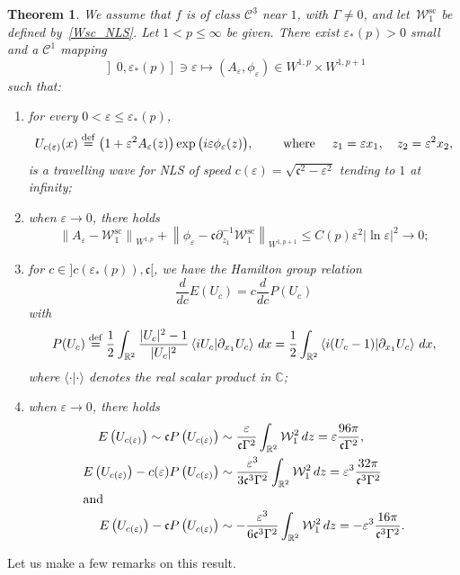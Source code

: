 \documentclass[10pt]{amsart}
\newtheorem{theo}{Theorem}[section]
\theoremstyle{definition}\newtheorem{defi}[theo]{Definition}\newtheorem{rema}[theo]{Remark}\newtheorem{exam}[theo]{Example}\newtheorem{exem}[theo]{Example}\newtheorem{nota}[theo]{Notation}
\newcommand*\p{\partial}
\newcommand*\R{\mathbb R}
\newcommand*\C{\mathbb C}
\newcommand*\ddef{\stackrel{\rm def}{=}}
\renewcommand{\sc}{\mathrm{sc}}
\newcommand*\BC{\mathcal{C}}
\newcommand*\BW{\mathcal{W}}
\newcommand*\cs{{\mathfrak c}}
\newcommand*\ii{\infty}
\newcommand*\ls{\leqslant }
\newcommand*\e{\varepsilon}
\newcommand*\lne{\lvert \ln \varepsilon \rvert}
\newcommand*{\romanenumi}{\renewcommand*{\theenumi}{\roman{enumi}}}
\begin{document}
\begin{theo}\label{mainTH}
We assume that $f$ is of class $ \BC^3 $ near $1 $, with $ \Gamma \neq 0 $, and let~$ \BW_1^{\sc} $ be defined by~\eqref{Wsc_NLS}. Let $ 1 < p \ls \ii $ be given. There exist $ \e_* (p) > 0 $ small and a $ \BC^1 $ mapping
\[
\left] 0, \e_*(p)\right] \ni \e \mapsto (A_\e, \phi_\e) \in W^{1,p} \times W^{1,p+1}
\]
such that:
\begin{enumerate}\romanenumi
\item\label{theo1.3.1} for every $ 0 < \e \ls \e_*(p) $,
\[
U_{c(\e)} (x) \ddef \big(1 + \e^2 A_\e (z) \big) \exp \big(i \e \phi_\e (z) \big),
\qquad \text{ where } \quad z_1 = \e x_1, \quad z_2 = \e^2 x_2,
\]
is a travelling wave for NLS of speed $ c(\e) = \sqrt{ \cs^2 - \e^2 } $ tending to $1$ at infinity;

\item\label{theo1.3.2} when $ \e \to 0 $, there holds
\[
\left\| A_\e - \BW_1^{\sc} \right\|_{ W^{1,p} } + \left\| \phi_\e - \cs \p_{z_1}^{-1} \BW_1^{\sc} \right\|_{ W^{1,p+1} }
\ls C(p) \e^2 \lne^2 \to 0 ;
\]
\item\label{theo1.3.3} for $ c \in] c(\e_*(p)), \cs [$, we have the Hamilton group relation
\[
\frac{d}{dc} E(U_c) = c \frac{d}{dc} P(U_c)
\]
with
\[
P(U_c) \ddef \frac{1}{2} \int_{\R^2} \frac{ \lvert U_c \rvert^2 - 1 }{ \lvert U_c \rvert^2 } \left\langle i U_c | \p_{x_1} U_c \right\rangle \, dx = \frac{1}{2} \int_{\R^2} \left\langle i (U_c - 1) \middle| \p_{x_1} U_c \right\rangle \, dx,
\]
where $ \langle \cdot | \cdot \rangle $ denotes the real scalar product in $ \C $;

\item\label{theo1.3.4} when $ \e \to 0 $, there holds
\begin{align*}
E\left(U_{c(\e)}\right) \sim \cs P \left(U_{c(\e)}\right) &\sim \frac{\e}{\cs \Gamma^2} \int_{\R^2} \BW_1^2 \, dz = \e \frac{96 \pi}{\cs \Gamma^2},
\\
E\left(U_{c(\e)}\right) - c(\e) P \left(U_{c(\e)}\right)
&\sim \frac{\e^3}{3 \cs^3 \Gamma^2} \int_{\R^2} \BW_1^2 \, dz = \e^3 \frac{32\pi}{\cs^3 \Gamma^2}
\\
\intertext{and}
E\left(U_{c(\e)}\right) - \cs P \left(U_{c(\e)}\right)
&\sim - \frac{\e^3}{6 \cs^3 \Gamma^2} \int_{\R^2} \BW_1^2 \, dz = - \e^3 \frac{16 \pi}{\cs^3 \Gamma^2}.
\end{align*}
\end{enumerate}
\end{theo}


Let us make a few remarks on this result.
\end{document}
